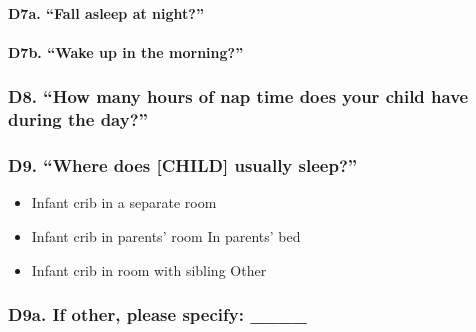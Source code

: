 \documentclass[
  12pt,
]{book}
\providecommand{\tightlist}{%
  \setlength{\itemsep}{0pt}\setlength{\parskip}{0pt}}
\begin{document}
\hypertarget{d7a.-fall-asleep-at-night}{%
\paragraph*{D7a. ``Fall asleep at night?''}\label{d7a.-fall-asleep-at-night}}

\hypertarget{d7b.-wake-up-in-the-morning}{%
\paragraph*{D7b. ``Wake up in the morning?''}\label{d7b.-wake-up-in-the-morning}}

\hypertarget{d8.-how-many-hours-of-nap-time-does-your-child-have-during-the-day}{%
\subsubsection*{D8. ``How many hours of nap time does your child have during the day?''}\label{d8.-how-many-hours-of-nap-time-does-your-child-have-during-the-day}}

\hypertarget{d9.-where-does-child-usually-sleep}{%
\subsubsection*{D9. ``Where does {[}CHILD{]} usually sleep?''}\label{d9.-where-does-child-usually-sleep}}

\begin{itemize}
\tightlist
\item
  Infant crib in a separate room
\item
  Infant crib in parents' room In parents' bed
\item
  Infant crib in room with sibling Other
\end{itemize}

\hypertarget{d9a.-if-other-please-specify-____}{%
\subsubsection*{D9a. If other, please specify: \_\_\_\_}\label{d9a.-if-other-please-specify-____}}
\end{document}
